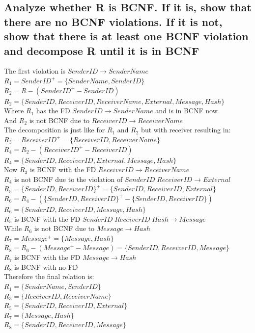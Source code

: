 \documentclass[12pt, a4paper]{article}
\begin{document}
		\subsection{Analyze whether R is BCNF. If it is, show that there are no BCNF violations. If it is not, show that there is at least one BCNF violation and decompose R until it is in BCNF}
			The first violation is $SenderID\rightarrow SenderName$\\
			$R_1=SenderID^+=\{SenderName,SenderID\}$\\
			$R_2=R-(SenderID^+-SenderID)$\\
			$R_2=\{SenderID,ReceiverID, ReceiverName, External, Message, Hash\}$\\
			Where $R_1$ has the FD $SenderID\rightarrow SenderName$ and is in BCNF now\\
			And $R_2$ is not BCNF due to $ReceiverID \rightarrow ReceiverName$\\[4mm]
			
			The decomposition is just like for $R_1$ and $R_2$ but with receiver resulting in:\\
			$R_3=ReceiverID^+=\{ReceiverID, ReceiverName\}$\\
			$R_4=R_2-(ReceiverID^+-ReceiverID)$\\
			$R_4=\{SenderID,ReceiverID, External, Message, Hash\}$\\
			Now $R_3$ is BCNF with the FD $ReceiverID \rightarrow ReceiverName$\\
			$R_4$ is not BCNF due to the violation of $SenderID\;ReceiverID \rightarrow External$\\[4mm]
			
			$R_5=\{SenderID,ReceiverID\}^+=\{SenderID,ReceiverID,External\}$\\
			$R_6=R_4-(\{SenderID,ReceiverID\}^+-\{SenderID,ReceiverID\})$\\
			$R_6=\{SenderID,ReceiverID, Message, Hash\}$\\
			$R_5$ is BCNF with the FD $SenderID\;ReceiverID\;Hash\rightarrow Message$\\
			While $R_6$ is not BCNF due to  $Message \rightarrow Hash$\\[4mm]
			
			$R_7=Message^+=\{Message,Hash\}$\\
			$R_8=R_6-(Message^+-Message)=\{SenderID,ReceiverID, Message\}$\\
			$R_7$ is BCNF with the FD $Message \rightarrow Hash$\\
			$R_8$ is BCNF with no FD\\[4mm]
			Therefore the final relation is:\\
			$R_1=\{SenderName,SenderID\}$\\
			$R_3=\{ReceiverID, ReceiverName\}$\\
			$R_5=\{SenderID,ReceiverID,External\}$\\
			$R_7=\{Message,Hash\}$\\
			$R_8=\{SenderID,ReceiverID, Message \}$\\
\end{document}

